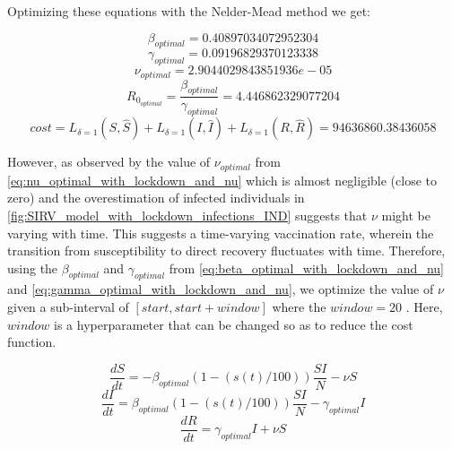 \documentclass[tikz,fleqn,12pt]{wlscirep}
\begin{document}
Optimizing these equations with the Nelder-Mead method we get:

\begin{equation}
  \beta_{optimal} = 0.40897034072952304
  \label{eq:beta_optimal_with_lockdown_and_nu}
\end{equation}
\begin{equation}
  \gamma_{optimal} = 0.09196829370123338
  \label{eq:gamma_optimal_with_lockdown_and_nu}
\end{equation}
\begin{equation}
  \nu_{optimal} = 2.9044029843851936e-05
  \label{eq:nu_optimal_with_lockdown_and_nu}
\end{equation}
\begin{equation}
  R_{0_{optimal}} = \frac{\beta_{optimal}}{\gamma_{optimal}} = 4.446862329077204
  \label{eq:r0_with_lockdown_and_nu}
\end{equation}
\begin{equation}
  cost = L_{\delta = 1}(S, \hat{S}) + L_{\delta = 1}(I, \hat{I}) + L_{\delta = 1}(R, \hat{R}) = 94636860.38436058
  \label{eq:cost_with_lockdown_and_nu}
\end{equation}

However, as observed by the value of $\nu_{optimal}$ from \ref{eq:nu_optimal_with_lockdown_and_nu} which is almost negligible (close to zero) and the overestimation of infected individuals in \ref{fig:SIRV_model_with_lockdown_infections_IND} suggests that $\nu$ might be varying with time. This suggests a time-varying vaccination rate, wherein the transition from susceptibility to direct recovery fluctuates with time. Therefore, using the $\beta_{optimal}$ and $\gamma_{optimal}$ from \ref{eq:beta_optimal_with_lockdown_and_nu} and \ref{eq:gamma_optimal_with_lockdown_and_nu}, we optimize the value of $\nu$ given a sub-interval of $[{start}, {start} + {window}]$ where the ${window} = 20$ \cite{Marinov2022}. Here, ${window}$ is a hyperparameter that can be changed so as to reduce the cost function.

\begin{equation}
  \frac{dS}{dt} = -\beta_{optimal}  (1 - (s(t)/100))  \frac{S I}{N} - \nu S
  \label{eq:S_with_lockdown_and_nu_calc_nu}
\end{equation}
\begin{equation}
  \frac{dI}{dt} = \beta_{optimal}  (1 - (s(t)/100)) \frac{S I}{N} - \gamma_{optimal} I
  \label{eq:I_with_lockdown_and_nu_calc_nu}
\end{equation}
\begin{equation}
  \frac{dR}{dt} = \gamma_{optimal} I + \nu S
  \label{eq:R_with_lockdown_and_nu_calc_nu}
\end{equation}
\end{document}
